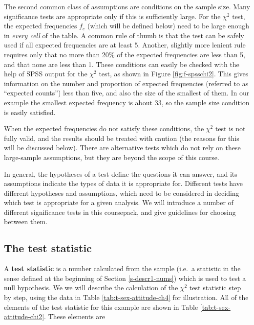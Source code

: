 \documentclass[11pt,a4paper,openany]{book}
\begin{document}
The second common class of assumptions are conditions on the sample
size. Many significance tests are appropriate only if this is
sufficiently large. For the \(\chi^{2}\) test, the expected frequencies
\(f_{e}\) (which will be defined below) need to be large enough in
\emph{every cell} of the table. A common rule of thumb is that the test
can be safely used if all expected frequencies are at least 5. Another,
slightly more lenient rule requires only that no more than 20\% of the
expected frequencies are less than 5, and that none are less than 1.
These conditions can easily be checked with the help of SPSS output for
the \(\chi^{2}\) test, as shown in Figure \ref{fig:f-spsschi2}. This
gives information on the number and proportion of expected frequencies
(referred to as ``expected counts'') less than five, and also the size
of the smallest of them. In our example the smallest expected frequency
is about 33, so the sample size condition is easily satisfied.

When the expected frequencies do not satisfy these conditions, the
\(\chi^{2}\) test is not fully valid, and the results should be treated
with caution (the reasons for this will be discussed below). There are
alternative tests which do not rely on these large-sample assumptions,
but they are beyond the scope of this course.

In general, the hypotheses of a test define the questions it can answer,
and its assumptions indicate the types of data it is appropriate for.
Different tests have different hypotheses and assumptions, which need to
be considered in deciding which test is appropriate for a given
analysis. We will introduce a number of different significance tests in
this coursepack, and give guidelines for choosing between them.

\subsection{The test statistic}\label{ss-tables-chi2test-stat}

A \textbf{test statistic} is a number calculated from the sample (i.e.~a
statistic in the sense defined at the beginning of Section
\ref{s-descr1-nums}) which is used to test a null hypothesis. We we will
describe the calculation of the \(\chi^{2}\) test statistic step by
step, using the data in Table \ref{tab:t-sex-attitude-ch4} for
illustration. All of the elements of the test statistic for this example
are shown in Table \ref{tab:t-sex-attitude-chi2}. These elements are
\end{document}
